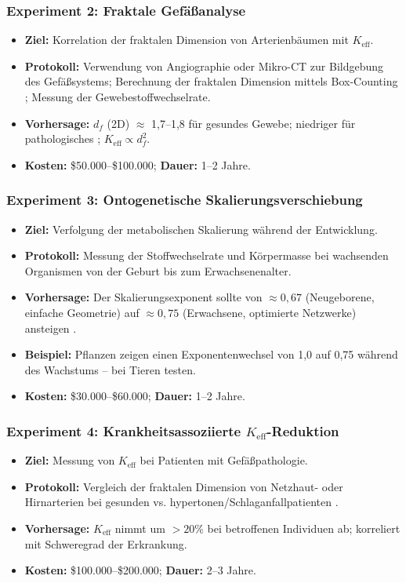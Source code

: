 \documentclass[12pt]{article}
\newcommand{\Keff}{K_{\mathrm{eff}}}
\begin{document}
	\subsubsection{Experiment 2: Fraktale Gefäßanalyse}
	\begin{itemize}
		\item \textbf{Ziel:} Korrelation der fraktalen Dimension von Arterienbäumen mit \(\Keff\).
		\item \textbf{Protokoll:} Verwendung von Angiographie oder Mikro-CT zur Bildgebung des Gefäßsystems; Berechnung der fraktalen Dimension mittels Box-Counting \cite{Cross1993}; Messung der Gewebestoffwechselrate.
		\item \textbf{Vorhersage:} \(d_f\) (2D) \(\approx\) 1,7–1,8 für gesundes Gewebe; niedriger für pathologisches \cite{Gould1993}; \(\Keff \propto d_f^2\).
		\item \textbf{Kosten:} \$50.000–\$100.000; \textbf{Dauer:} 1–2 Jahre.
	\end{itemize}
	
	\subsubsection{Experiment 3: Ontogenetische Skalierungsverschiebung}
	\begin{itemize}
		\item \textbf{Ziel:} Verfolgung der metabolischen Skalierung während der Entwicklung.
		\item \textbf{Protokoll:} Messung der Stoffwechselrate und Körpermasse bei wachsenden Organismen von der Geburt bis zum Erwachsenenalter.
		\item \textbf{Vorhersage:} Der Skalierungsexponent sollte von \(\approx 0,67\) (Neugeborene, einfache Geometrie) auf \(\approx 0,75\) (Erwachsene, optimierte Netzwerke) ansteigen \cite{Glazier2005}.
		\item \textbf{Beispiel:} Pflanzen zeigen einen Exponentenwechsel von 1,0 auf 0,75 während des Wachstums \cite{Reich2006} – bei Tieren testen.
		\item \textbf{Kosten:} \$30.000–\$60.000; \textbf{Dauer:} 1–2 Jahre.
	\end{itemize}
	
	\subsubsection{Experiment 4: Krankheitsassoziierte \(\Keff\)-Reduktion}
	\begin{itemize}
		\item \textbf{Ziel:} Messung von \(\Keff\) bei Patienten mit Gefäßpathologie.
		\item \textbf{Protokoll:} Vergleich der fraktalen Dimension von Netzhaut- oder Hirnarterien bei gesunden vs. hypertonen/Schlaganfallpatienten \cite{Gould1993}.
		\item \textbf{Vorhersage:} \(\Keff\) nimmt um \(>20\%\) bei betroffenen Individuen ab; korreliert mit Schweregrad der Erkrankung.
		\item \textbf{Kosten:} \$100.000–\$200.000; \textbf{Dauer:} 2–3 Jahre.
	\end{itemize}
	
\end{document}
